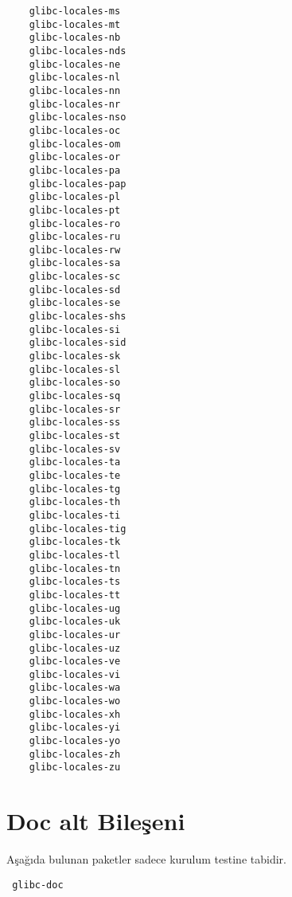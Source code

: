 \documentclass[a4paper,10pt]{article}
\begin{document}
\begin{enumerate}
\begin{verbatim}
    glibc-locales-ms
    glibc-locales-mt
    glibc-locales-nb
    glibc-locales-nds
    glibc-locales-ne
    glibc-locales-nl
    glibc-locales-nn
    glibc-locales-nr
    glibc-locales-nso
    glibc-locales-oc
    glibc-locales-om
    glibc-locales-or
    glibc-locales-pa
    glibc-locales-pap
    glibc-locales-pl
    glibc-locales-pt
    glibc-locales-ro
    glibc-locales-ru
    glibc-locales-rw
    glibc-locales-sa
    glibc-locales-sc
    glibc-locales-sd
    glibc-locales-se
    glibc-locales-shs
    glibc-locales-si
    glibc-locales-sid
    glibc-locales-sk
    glibc-locales-sl
    glibc-locales-so
    glibc-locales-sq
    glibc-locales-sr
    glibc-locales-ss
    glibc-locales-st
    glibc-locales-sv
    glibc-locales-ta
    glibc-locales-te
    glibc-locales-tg
    glibc-locales-th
    glibc-locales-ti
    glibc-locales-tig
    glibc-locales-tk
    glibc-locales-tl
    glibc-locales-tn
    glibc-locales-ts
    glibc-locales-tt
    glibc-locales-ug
    glibc-locales-uk
    glibc-locales-ur
    glibc-locales-uz
    glibc-locales-ve
    glibc-locales-vi
    glibc-locales-wa
    glibc-locales-wo
    glibc-locales-xh
    glibc-locales-yi
    glibc-locales-yo
    glibc-locales-zh
    glibc-locales-zu
\end{verbatim}
\end{enumerate}

\section{Doc alt Bileşeni}

Aşağıda bulunan paketler sadece kurulum testine tabidir.
\begin{verbatim}
 glibc-doc
\end{verbatim}
\end{document}
